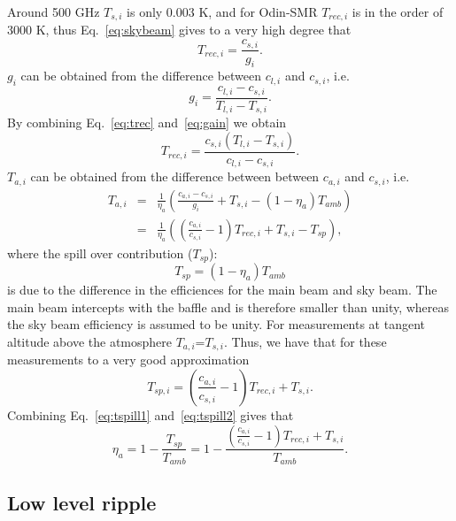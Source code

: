 Around 500 GHz \(T_{s,i}\) is only 0.003 K, and for Odin-SMR
\(T_{rec,i}\) is in the order of 3000 K, thus Eq.~\ref{eq:skybeam} gives
to a very high degree that
\begin{equation}
\label{eq:trec}
T_{rec,i}=\frac{c_{s,i}}{g_{i}}.
\end{equation}
\(g_{i}\) can be obtained from the difference between \(c_{l,i}\) and
 \(c_{s,i}\), i.e.
\begin{equation}
\label{eq:gain}
g_{i}=\frac{c_{l,i}-c_{s,i}}{T_{l,i}-T_{s,i}}.
\end{equation}
By combining Eq.~\ref{eq:trec} and~\ref{eq:gain} we obtain
\begin{equation}
\label{eq:trec2}
T_{rec,i}=\frac{c_{s,i}({T_{l,i}-T_{s,i}})}{c_{l,i}-c_{s,i}}.
\end{equation}
\(T_{a,i}\) can be obtained from the difference between between
\(c_{a,i}\) and \(c_{s,i}\), i.e.
\begin{eqnarray}
\label{eq:ta}
T_{a,i} &=& \frac{1}{\eta_{a}}\left(\frac{c_{a,i}-c_{s,i}}{g_{i}}+T_{s,i}-(1-\eta_{a})T_{amb}\right) \nonumber\\
 &=& \frac{1}{\eta_{a}}\left( \left(\frac{c_{a,i}}{c_{s,i}}-1\right)T_{rec,i}+T_{s,i}-T_{sp}\right), 
\end{eqnarray}
where the spill over contribution (\(T_{sp}\)): 
\begin{equation}
\label{eq:tspill1}
T_{sp}=(1-\eta_{a})T_{amb}
\end{equation}
is due to the difference
in the efficiences for the main beam and sky beam.
The main beam intercepts with the baffle and is therefore
smaller than unity, whereas the sky beam efficiency is assumed to be unity. 
For measurements at tangent altitude above the atmosphere
\(T_{a,i}\)=\(T_{s,i}\). Thus, we have that for these measurements
to a very good approximation
\begin{equation}
\label{eq:tspill2}
T_{sp,i}= \left(\frac{c_{a,i}}{c_{s,i}}-1\right)T_{rec,i}+T_{s,i}.
\end{equation}
Combining Eq.~\ref{eq:tspill1} and~\ref{eq:tspill2} gives that
\begin{equation}
\label{eq:eta}
\eta_{a}=1-\frac{T_{sp}}{T_{amb}}=1-\frac{\left(\frac{c_{a,i}}{c_{s,i}}-1\right)T_{rec,i}+T_{s,i}}{T_{amb}}.
\end{equation}

\subsection{Low level ripple}

